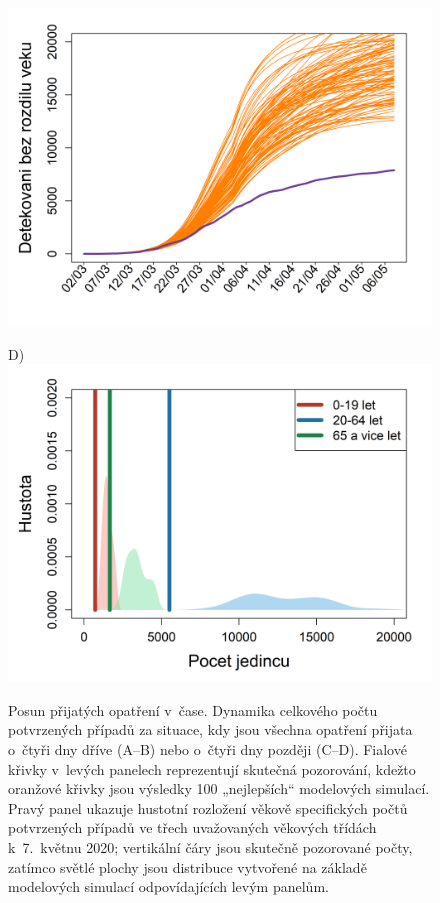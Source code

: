 \begin{figure}
\begin{center}
\begin{minipage}[m]{0.45\textwidth}
			\includegraphics[width = \textwidth]{pic/sc_4later.png}
		\end{minipage}
		\begin{minipage}[m]{0.45\textwidth}
			D) \\
			\includegraphics[width = \textwidth]{pic/sc_4later_PDF.png}
		\end{minipage}
	\end{center}
	\caption{Posun přijatých opatření v~čase. Dynamika celkového počtu potvrzených případů za situace, kdy jsou všechna opatření přijata o~čtyři dny dříve (A--B) nebo o~čtyři dny později (C--D). Fialové křivky v~levých panelech reprezentují skutečná pozorování, kdežto oranžové křivky jsou výsledky 100 „nejlepších“ modelových simulací. Pravý panel ukazuje hustotní rozložení věkově specifických počtů potvrzených případů ve třech uvažovaných věkových třídách k~7.\ květnu 2020; vertikální čáry jsou skutečně pozorované počty, zatímco světlé plochy jsou distribuce vytvořené na základě modelových simulací odpovídajících levým panelům.}
	\label{scenariosR1R2}
\end{figure}

